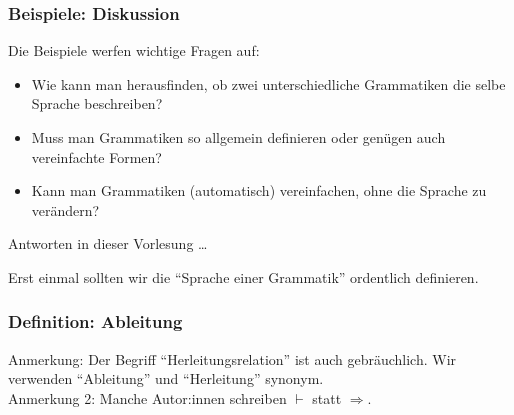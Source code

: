 \documentclass[aspectratio=1610,onlymath]{beamer}
\begin{document}
\begin{frame}\frametitle{Beispiele: Diskussion}

Die Beispiele werfen \alert{wichtige Fragen} auf:
\begin{itemize}
\item Wie kann man herausfinden, ob zwei unterschiedliche Grammatiken die selbe Sprache beschreiben?
\item Muss man Grammatiken so allgemein definieren oder genügen auch vereinfachte Formen?
\item Kann man Grammatiken (automatisch) vereinfachen, ohne die Sprache zu verändern?
\end{itemize}

Antworten in dieser Vorlesung \ldots\bigskip

Erst einmal sollten wir die \alert{"`Sprache einer Grammatik"'} ordentlich definieren.

\end{frame}

\begin{frame}\frametitle{Definition: Ableitung}


\medskip


{\footnotesize \textcolor{devilscss}{Anmerkung: Der Begriff "`Herleitungsrelation"' ist auch gebräuchlich. Wir verwenden "`Ableitung"' und "`Herleitung"' synonym.\\
Anmerkung 2: Manche Autor:innen schreiben $\vdash$ statt $\Rightarrow$.}}

\end{frame}
\end{document}
